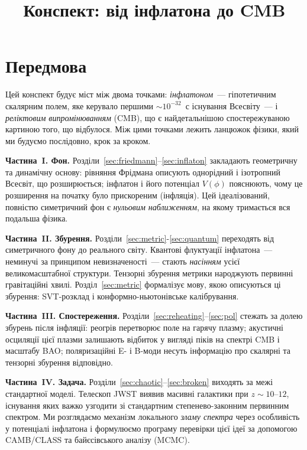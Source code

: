 \documentclass[12pt, a4paper]{article}
\title{\bfseries Конспект: від інфлатона до CMB}
\author{}
\date{}
\begin{document}
\maketitle
\tableofcontents
\newpage



\section*{Передмова}


Цей конспект будує міст між двома точками: \emph{інфлатоном}~---
гіпотетичним скалярним полем, яке керувало першими
${\sim}10^{-32}$~с існування Всесвіту~--- і \emph{реліктовим випромінюванням} (CMB),
що є найдетальнішою спостережуваною картиною того, що відбулося.
Між цими точками лежить ланцюжок фізики, який ми будуємо
послідовно, крок за кроком.

\textbf{Частина~I. Фон.} Розділи~\ref{sec:friedmann}–\ref{sec:inflaton}
закладають геометричну та динамічну основу: рівняння Фрідмана описують
однорідний і ізотропний Всесвіт, що розширюється; інфлатон і його
потенціал $V(\phi)$ пояснюють, чому це розширення на початку було
прискореним (інфляція). Цей ідеалізований, повністю симетричний фон є
\emph{нульовим наближенням}, на якому тримається вся подальша фізика.

\textbf{Частина~II. Збурення.} Розділи~\ref{sec:metric}-\ref{sec:quantum}
переходять від симетричного фону до реального світу. Квантові флуктуації
інфлатона~--- неминучі за принципом невизначеності~--- стають
\emph{насінням} усієї великомасштабної структури. Тензорні збурення
метрики народжують первинні гравітаційні хвилі. Розділ~\ref{sec:metric}
формалізує мову, якою описуються ці збурення: SVT-розклад і
конформно-ньютонівське калібрування.

\textbf{Частина~III. Спостереження.} Розділи~\ref{sec:reheating}–\ref{sec:pol}
стежать за долею збурень після інфляції: реогрів перетворює поле на
гарячу плазму; акустичні осциляції цієї плазми залишають відбиток у
вигляді піків на спектрі CMB і масштабу BAO; поляризаційні E- і B-моди
несуть інформацію про скалярні та тензорні збурення відповідно.

\textbf{Частина~IV. Задача.} Розділи~\ref{sec:chaotic}–\ref{sec:broken}
виходять за межі стандартної моделі. Телескоп JWST виявив масивні
галактики при $z \sim 10$–$12$, існування яких важко узгодити зі
стандартним степенево-законним первинним спектром. Ми розглядаємо
механізм локального \emph{зламу спектра} через особливість у потенціалі
інфлатона і формулюємо програму перевірки цієї ідеї за допомогою
CAMB/CLASS та байєсівського аналізу (MCMC).
\end{document}

